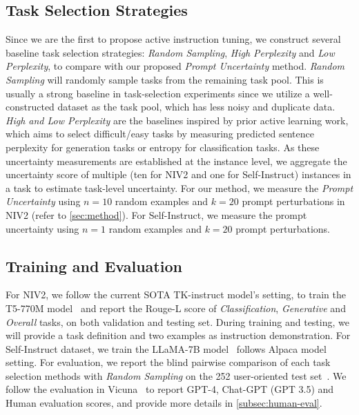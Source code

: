 \subsection{Task Selection Strategies}
Since we are the first to propose active instruction tuning, we construct several baseline task selection strategies: \textit{Random Sampling}, \textit{High Perplexity} and \textit{Low Perplexity}, to compare with our proposed \textit{Prompt Uncertainty} method.
\textit{Random Sampling} will randomly sample tasks from the remaining task pool. This is usually a strong baseline in task-selection experiments 
since we utilize a well-constructed dataset as the task pool, which has less noisy and duplicate data. 
\textit{High and Low Perplexity} are the baselines inspired by prior active learning work, which aims to select difficult/easy tasks by measuring predicted sentence perplexity for generation tasks or entropy for classification tasks. As these uncertainty measurements are established at the instance level, we aggregate the uncertainty score of multiple (ten for NIV2 and one for Self-Instruct) instances in a task to estimate task-level uncertainty.
For our method, we measure the \textit{Prompt Uncertainty} using $n=10$ random examples and $k=20$ prompt perturbations in NIV2 (refer to \autoref{sec:method}). 
For Self-Instruct, we measure the prompt uncertainty using $n=1$ random examples and $k=20$ prompt perturbations.





\subsection{Training and Evaluation}
For NIV2, we follow the current SOTA TK-instruct model's setting, to train the T5-770M model~\cite{raffel2020exploring} and report the Rouge-L score of \textit{Classification}, \textit{Generative} and \textit{Overall} tasks, on both validation and testing set. During training and testing, we will provide a task definition and two examples as instruction demonstration.
For Self-Instruct dataset, we train the LLaMA-7B model~\cite{touvron2023llama} follows Alpaca model setting.
For evaluation, we report the blind pairwise comparison of each task selection methods with \textit{Random Sampling} on the 252 user-oriented test set~\cite{wang2022self}. We follow the evaluation in Vicuna~\cite{vicuna2023} to report GPT-4, Chat-GPT (GPT 3.5) and Human evaluation scores, and provide more details in \autoref{subsec:human-eval}.

